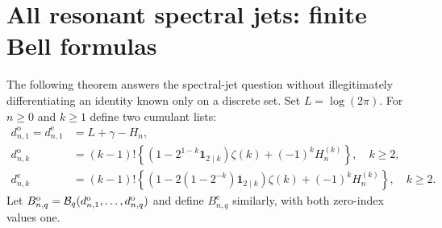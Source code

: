 \documentclass[11pt,letterpaper]{article}
\theoremstyle{definition}\newtheorem{definition}[theorem]{Definition}
\theoremstyle{remark}\newtheorem{remark}[theorem]{Remark}
\begin{document}
\section{All resonant spectral jets: finite Bell formulas}
\label{mr:sec:resonance}
The following theorem answers the spectral-jet question without
illegitimately differentiating an identity known only on a discrete set.
Set $L=\log(2\pi)$. For $n\ge0$ and $k\ge1$ define two cumulant lists:
\begin{align}
 d^{\mathrm o}_{n,1}=d^{\mathrm e}_{n,1}
 &=L+\gamma-H_n,\label{mr:eq:d1}\\
 d^{\mathrm o}_{n,k}
 &=(k-1)!\left\{(1-2^{1-k}\mathbf1_{2\mid k})\zeta(k)
                      +(-1)^k H_n^{(k)}\right\},\quad k\ge2,
 \label{mr:eq:do}\\
 d^{\mathrm e}_{n,k}
 &=(k-1)!\left\{(1-2(1-2^{-k})\mathbf1_{2\mid k})\zeta(k)
                      +(-1)^k H_n^{(k)}\right\},\quad k\ge2.
 \label{mr:eq:de}
\end{align}
Let $B_{n,q}^{\mathrm o}=\mathcal B_q(d^{\mathrm o}_{n,1},\ldots,d^{\mathrm o}_{n,q})$
and define $B_{n,q}^{\mathrm e}$ similarly, with both zero-index values one.
\end{document}
